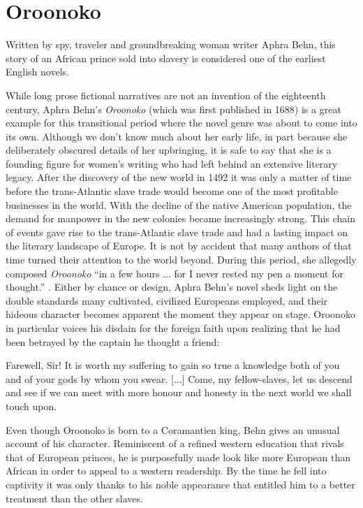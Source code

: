 \section{Oroonoko}

\begin{displayquote}
Written by spy, traveler and groundbreaking woman writer Aphra Behn, this story 
of an African prince sold into slavery is considered one of the earliest English 
novels. \autocite{behn2003}
\end{displayquote}

While long prose fictional narratives are not an invention of the eighteenth 
century, Aphra Behn’s \emph{Oroonoko} (which was first published in 1688) is a 
great example for this transitional period where the novel genre was about to 
come into its own. Although we don’t know much about her early life, in part 
because she deliberately obscured details of her upbringing, it is safe to say 
that she is a founding figure for women’s writing who had left behind an 
extensive literary legacy. After the discovery of the new world in 1492 it was 
only a matter of time before the trans-Atlantic slave trade would become one of 
the most profitable businesses in the world. With the decline of the native 
American population, the demand for manpower in the new colonies became 
increasingly strong. This chain of events gave rise to the trans-Atlantic slave 
trade and had a lasting impact on the literary landscape of Europe. It is not by 
accident that many authors of that time turned their attention to the world 
beyond. During this period, she allegedly composed \emph{Oroonoko} “in a few 
hours ... for I never rested my pen a moment for thought.” 
\autocite[2178]{greenblatt2006}. Either by chance or design, Aphra Behn’s novel 
sheds light on the double standards many cultivated, civilized Europeans 
employed, and their hideous character becomes apparent the moment they appear on 
stage. Oroonoko in particular voices his disdain for the foreign faith upon 
realizing that he had been betrayed by the captain he thought a friend:

\begin{displayquote}
Farewell, Sir! It is worth my suffering to gain so true a knowledge both of you 
and of your gods by whom you swear. [...] Come, my fellow-slaves, let us descend 
and see if we can meet with more honour and honesty in the next world we shall 
touch upon. \autocite[58]{behn2003}
\end{displayquote}

Even though Oroonoko is born to a Coramantien king, Behn gives an unusual 
account of his character. Reminiscent of a refined western education that rivals 
that of European princes, he is purposefully made look like more European than 
African in order to appeal to a western readership. By the time he fell into 
captivity it was only thanks to his noble appearance that entitled him to a 
better treatment than the other slaves. 

